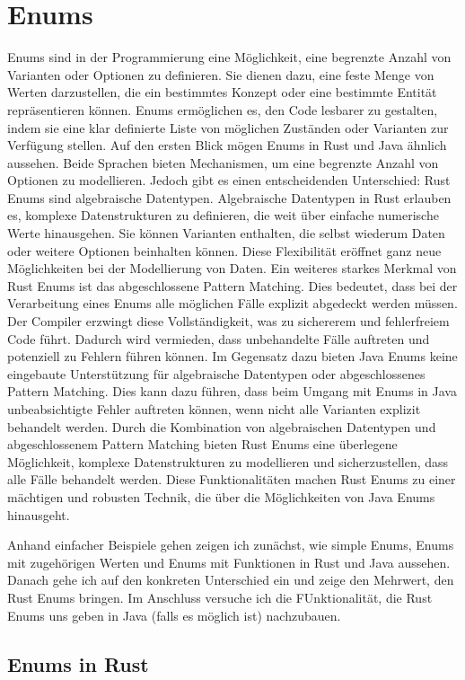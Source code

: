 \documentclass[a4paper, 1ppt]{article}
\begin{document}
\section{Enums}
Enums sind in der Programmierung eine Möglichkeit, eine begrenzte Anzahl von Varianten oder Optionen zu definieren. Sie dienen dazu, eine feste Menge von Werten darzustellen, die ein bestimmtes Konzept oder eine bestimmte Entität repräsentieren können. Enums ermöglichen es, den Code lesbarer zu gestalten, indem sie eine klar definierte Liste von möglichen Zuständen oder Varianten zur Verfügung stellen.
Auf den ersten Blick mögen Enums in Rust und Java ähnlich aussehen. Beide Sprachen bieten Mechanismen, um eine begrenzte Anzahl von Optionen zu modellieren. Jedoch gibt es einen entscheidenden Unterschied: Rust Enums sind algebraische Datentypen.
Algebraische Datentypen in Rust erlauben es, komplexe Datenstrukturen zu definieren, die weit über einfache numerische Werte hinausgehen. Sie können Varianten enthalten, die selbst wiederum Daten oder weitere Optionen beinhalten können. Diese Flexibilität eröffnet ganz neue Möglichkeiten bei der Modellierung von Daten.
Ein weiteres starkes Merkmal von Rust Enums ist das abgeschlossene Pattern Matching. Dies bedeutet, dass bei der Verarbeitung eines Enums alle möglichen Fälle explizit abgedeckt werden müssen. Der Compiler erzwingt diese Vollständigkeit, was zu sichererem und fehlerfreiem Code führt. Dadurch wird vermieden, dass unbehandelte Fälle auftreten und potenziell zu Fehlern führen können.
Im Gegensatz dazu bieten Java Enums keine eingebaute Unterstützung für algebraische Datentypen oder abgeschlossenes Pattern Matching. Dies kann dazu führen, dass beim Umgang mit Enums in Java unbeabsichtigte Fehler auftreten können, wenn nicht alle Varianten explizit behandelt werden.
Durch die Kombination von algebraischen Datentypen und abgeschlossenem Pattern Matching bieten Rust Enums eine überlegene Möglichkeit, komplexe Datenstrukturen zu modellieren und sicherzustellen, dass alle Fälle behandelt werden. Diese Funktionalitäten machen Rust Enums zu einer mächtigen und robusten Technik, die über die Möglichkeiten von Java Enums hinausgeht.

Anhand einfacher Beispiele gehen zeigen ich zunächst, wie simple Enums, Enums mit zugehörigen Werten und Enums mit Funktionen in Rust und Java aussehen. Danach gehe ich auf den konkreten Unterschied ein und zeige den Mehrwert, den Rust Enums bringen. 
Im Anschluss versuche ich die FUnktionalität, die Rust Enums uns geben in Java (falls es möglich ist) nachzubauen.
\subsection{Enums in Rust}
\end{document}
